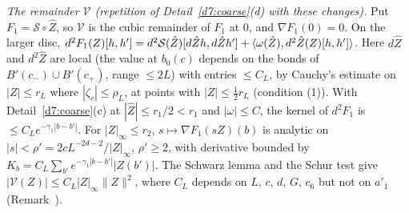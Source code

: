 \begin{detail}
\begin{step}
\emph{The remainder $\mathcal V$ (repetition of Detail~\ref{d7:coarse}(d) with these changes).} Put $F_1=\mathcal S\circ\hat Z$, so $\mathcal V$ is the cubic remainder of $F_1$ at $0$, and $\nabla F_1(0)=0$. On the larger disc, $d^2F_1(Z)[h,h']=d^2\mathcal S(\hat Z)[d\hat Zh,d\hat Zh']+\langle \omega(\hat Z),d^2\hat Z(Z)[h,h']\rangle$. Here $d\hat Z$ and $d^2\hat Z$ are local (the value at $b_0(c)$ depends on the bonds of $B'(c_-)\cup B'(c_+)$, range $\le2L$) with entries $\le C_L$, by Cauchy's estimate on $|Z|\le r_L$ where $|\zeta_c|\le\rho_L$, at points with $|Z|\le\frac12r_L$ (condition (1)). With Detail~\ref{d7:coarse}(c) at $|\hat Z|\le r_1/2<r_1$ and $|\omega|\le C$, the kernel of $d^2F_1$ is $\le C_Le^{-\gamma_1|b-b'|}$. For $|Z|_\infty\le r_2$, $s\mapsto\nabla F_1(sZ)(b)$ is analytic on $|s|<\rho'=2cL^{-2d-2}/|Z|_\infty$, $\rho'\ge2$, with derivative bounded by $K_b=C_L\sum_{b'}e^{-\gamma_1|b-b'|}|Z(b')|$. The Schwarz lemma and the Schur test give $|\mathcal V(Z)|\le C_L|Z|_\infty\|Z\|^2$, where $C_L$ depends on $L$, $c$, $d$, $G$, $c_6$ but not on $a'_1$ (Remark~).
\end{step}
\end{detail}

